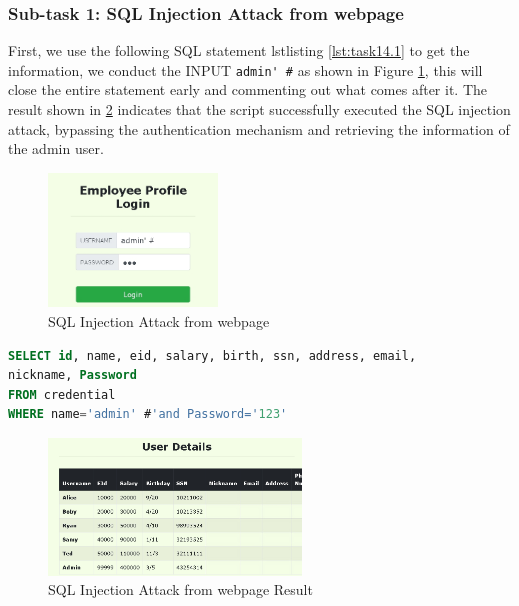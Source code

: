 \documentclass[a4paper,11pt]{article}
\begin{document}
\subsubsection{Sub-task 1: SQL Injection Attack from webpage}
First, we use the following SQL statement lstlisting \ref{lst:task14.1} to get the information, we conduct the INPUT \verb|admin' #| as shown in Figure \ref{fig:task14.1}, this will close the entire statement early and commenting out what comes after it. The result shown in \ref{fig:task14.2} indicates that the script successfully executed the SQL injection attack, bypassing the authentication mechanism and retrieving the information of the admin user. 
\begin{figure}[h]
    \centering
       \includegraphics[width=0.4\textwidth]{figures/task14/task14.1.png}
    \caption{SQL Injection Attack from webpage}\label{fig:task14.1}
\end{figure}

\begin{lstlisting}[caption={SQL Injection},label={lst:task14.1},language=SQL,breaklines=true]
SELECT id, name, eid, salary, birth, ssn, address, email,
nickname, Password 
FROM credential
WHERE name='admin' #'and Password='123'
\end{lstlisting}

\begin{figure}[h]
    \centering
       \includegraphics[width=0.6\textwidth]{figures/task14/task14.2.png}
    \caption{SQL Injection Attack from webpage Result}\label{fig:task14.2}
\end{figure}
\end{document}
